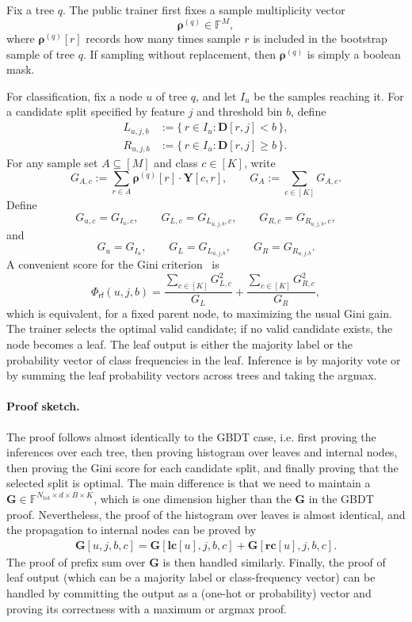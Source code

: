 Fix a tree $q$. The public trainer first fixes a sample multiplicity vector
\[
    \boldsymbol{\rho}^{(q)}\in\mathbb{F}^{M},
\]
where $\boldsymbol{\rho}^{(q)}[r]$ records how many times sample $r$ is included
in the bootstrap sample of tree $q$. If sampling without replacement,
then $\boldsymbol{\rho}^{(q)}$ is simply a boolean mask.

For classification, fix a node $u$ of tree $q$, and let $I_u$ be the samples
reaching it. For a candidate split specified by feature $j$ and threshold bin
$b$, define
\begin{align}
L_{u,j,b} &:= \{\, r\in I_u : \mathbf{D}[r,j] < b \,\},\\
R_{u,j,b} &:= \{\, r\in I_u : \mathbf{D}[r,j] \ge b \,\}.
\end{align}
For any sample set $A\subseteq[M]$ and class $c\in[K]$, write
\[
    G_{A,c}
    :=
    \sum_{r\in A}\boldsymbol{\rho}^{(q)}[r]\cdot \mathbf{Y}[c,r],
    \qquad
    G_A := \sum_{c\in[K]} G_{A,c}.
\]
Define
\[
    G_{u,c}=G_{I_u,c},\qquad
    G_{L,c}=G_{L_{u,j,b},c},\qquad
    G_{R,c}=G_{R_{u,j,b},c},
\]
and
\[
    G_u = G_{I_u},\qquad
    G_L = G_{L_{u,j,b}},\qquad
    G_R = G_{R_{u,j,b}}.
\]
A convenient score for the Gini criterion~\cite{CART1984} is
\begin{equation}\label{eq:rf-gini-score}
    \Phi_{\mathsf{rf}}(u,j,b)
    =
    \frac{\sum_{c\in[K]} G_{L,c}^2}{G_L}
    +
    \frac{\sum_{c\in[K]} G_{R,c}^2}{G_R},
\end{equation}
which is equivalent, for a fixed parent node, to maximizing the usual Gini gain.
The trainer selects the optimal valid candidate; if no valid candidate exists, the node becomes a leaf.  The leaf output is either the majority label or the probability vector of class frequencies in the leaf.  Inference is by majority vote or by summing the leaf probability vectors across trees and taking the argmax.

\paragraph{Proof sketch.}
The proof follows almost identically to the GBDT case,
i.e. first proving the inferences over each tree,
then proving histogram over leaves and internal nodes, then proving the Gini score for each candidate split, and finally proving that the selected split is optimal.
The main difference is that we need to maintain a $\mathbf{G}\in \mathbb{F}^{N_{\mathrm{tot}}\times d\times B\times K}$,
which is one dimension higher than the $\mathbf{G}$ in the GBDT proof.
Nevertheless, the proof of the histogram over leaves is almost identical,
and the propagation to internal nodes can be proved by
\begin{align}
    \mathbf{G}[u,j,b,c] = \mathbf{G}[\mathbf{lc}[u],j,b,c] + \mathbf{G}[\mathbf{rc}[u],j,b,c].
\end{align}
The proof of prefix sum over $\mathbf{G}$ is then handled similarly.
Finally, the proof of leaf output (which can be a majority label or class-frequency vector)
can be handled by committing the output as a (one-hot or probability) vector and proving its correctness with a maximum or argmax proof.
